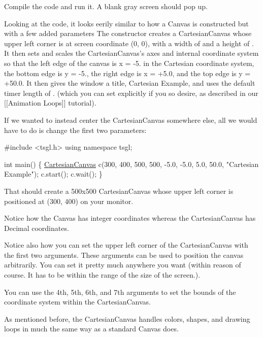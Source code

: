 Compile the code and run it. A blank gray screen should pop up.

Looking at the code, it looks eerily similar to how a Canvas is constructed but with a few added parameters The constructor creates a Cartesian\-Canvas whose upper left corner is at screen coordinate {\ttfamily (0, 0)}, with a width of {} and a height of {}. It then sets and scales the Cartesian\-Canvas’s axes and internal coordinate system so that the left edge of the canvas is {\ttfamily x = -\/5.} in the Cartesian coordinate system, the bottom edge is {\ttfamily y = -\/5.}, the right edge is {\ttfamily x = +5.0}, and the top edge is {\ttfamily y = +50.0}. It then gives the window a title, {\ttfamily Cartesian Example}, and uses the default timer length of {.} (which you can set explicitly if you so desire, as described in our \mbox{[}\mbox{[}Animation Loops\mbox{]}\mbox{]} tutorial).

If we wanted to instead center the Cartesian\-Canvas somewhere else, all we would have to do is change the first two parameters\-:


\begin{DoxyCode}
\textcolor{preprocessor}{#include <tsgl.h>}
\textcolor{keyword}{using namespace }tsgl;

\textcolor{keywordtype}{int} main() \{
  \hyperlink{classtsgl_1_1_cartesian_canvas}{CartesianCanvas} c(300, 400, 500, 500, -5.0, -5.0, 5.0, 50.0, \textcolor{stringliteral}{"Cartesian Example"});
  c.start();
  c.wait();
\}
\end{DoxyCode}


That should create a 500x500 Cartesian\-Canvas whose upper left corner is positioned at {\ttfamily (300, 400)} on your monitor.

Notice how the Canvas has integer coordinates whereas the Cartesian\-Canvas has Decimal coordinates.

Notice also how you can set the upper left corner of the Cartesian\-Canvas with the first two arguments. These arguments can be used to position the canvas arbitrarily. You can set it pretty much anywhere you want (within reason of course. It has to be within the range of the size of the screen.).

You can use the 4th, 5th, 6th, and 7th arguments to set the bounds of the coordinate system within the Cartesian\-Canvas.

As mentioned before, the Cartesian\-Canvas handles colors, shapes, and drawing loops in much the same way as a standard Canvas does.

